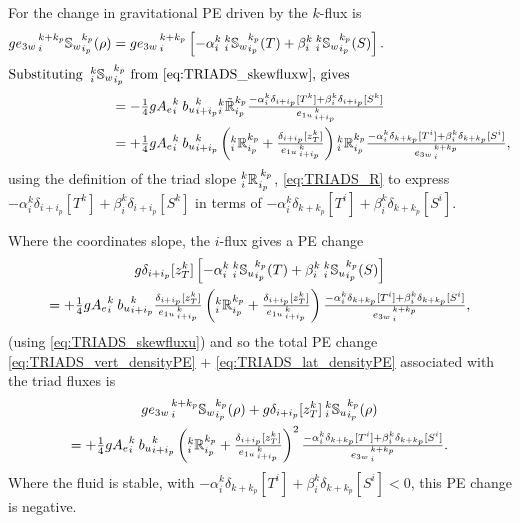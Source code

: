 \documentclass[../main/NEMO_manual]{subfiles}
\newcommand{\triadt}[5]{\ensuremath{{}_{#1}^{#2}{\tilde{\mathbb{#3}}}_{#4}^{\,#5}}}
\newcommand{\rtriad}[2][]{\ensuremath{\triad[#1]{i}{k}{#2}{i_p}{k_p}}}
\newcommand{\rtriadt}[1]{\ensuremath{\triadt{i}{k}{#1}{i_p}{k_p}}}
\begin{document}
For the change in gravitational PE driven by the $k$-flux is
\begin{align}
  \label{eq:TRIADS_vert_densityPE}
  g {e_{3w}}_{\,i}^{\,k+k_p}{\mathbb{S}_w}_{i_p}^{k_p} (\rho)
  &=g {e_{3w}}_{\,i}^{\,k+k_p}\left[-\alpha _i^k {\:}_i^k
    {\mathbb{S}_w}_{i_p}^{k_p} (T) + \beta_i^k {\:}_i^k
    {\mathbb{S}_w}_{i_p}^{k_p} (S) \right]. \notag \\
  \intertext{Substituting  ${\:}_i^k {\mathbb{S}_w}_{i_p}^{k_p}$ from \autoref{eq:TRIADS_skewfluxw}, gives}
  &=-\fractext{1}{4} g{A_e}_i^k{\: }{b_u}_{i+i_p}^k {_i^k\tilde{\mathbb{R}}_{i_p}^{k_p}}
    \frac{ -\alpha _i^k\delta_{i+ i_p}[T^k]+ \beta_i^k\delta_{i+ i_p}[S^k]} { {e_{1u}}_{\,i + i_p}^{\,k} } \notag \\
  &=+\fractext{1}{4} g{A_e}_i^k{\: }{b_u}_{i+i_p}^k
    \left({_i^k\mathbb{R}_{i_p}^{k_p}}+\frac{\delta_{i+i_p}[z_T^k]}{{e_{1u}}_{\,i + i_p}^{\,k}}\right) {_i^k\mathbb{R}_{i_p}^{k_p}}
    \frac{-\alpha_i^k \delta_{k+ k_p}[T^i]+ \beta_i^k\delta_{k+ k_p}[S^i]} {{e_{3w}}_{\,i}^{\,k+k_p}},
\end{align}
using the definition of the triad slope $\rtriad{R}$, \autoref{eq:TRIADS_R} to
express $-\alpha _i^k\delta_{i+ i_p}[T^k]+\beta_i^k\delta_{i+ i_p}[S^k]$ in terms of
$-\alpha_i^k \delta_{k+ k_p}[T^i]+ \beta_i^k\delta_{k+ k_p}[S^i]$.

Where the coordinates slope, the $i$-flux gives a PE change
\begin{multline}
  \label{eq:TRIADS_lat_densityPE}
  g \delta_{i+i_p}[z_T^k]
  \left[
    -\alpha _i^k {\:}_i^k {\mathbb{S}_u}_{i_p}^{k_p} (T) + \beta_i^k {\:}_i^k {\mathbb{S}_u}_{i_p}^{k_p} (S)
  \right] \\
  = +\textstyle \frac{1}{4} g{A_e}_i^k{\: }{b_u}_{i+i_p}^k
  \frac{\delta_{i+i_p}[z_T^k]}{{e_{1u}}_{\,i + i_p}^{\,k}}
  \left({_i^k\mathbb{R}_{i_p}^{k_p}}+\frac{\delta_{i+i_p}[z_T^k]}{{e_{1u}}_{\,i + i_p}^{\,k}}\right)
  \frac{-\alpha_i^k \delta_{k+ k_p}[T^i]+ \beta_i^k\delta_{k+ k_p}[S^i]} {{e_{3w}}_{\,i}^{\,k+k_p}},
\end{multline}
(using \autoref{eq:TRIADS_skewfluxu}) and so the total PE change \autoref{eq:TRIADS_vert_densityPE} +
\autoref{eq:TRIADS_lat_densityPE} associated with the triad fluxes is
\begin{multline*}
  g{e_{3w}}_{\,i}^{\,k+k_p}{\mathbb{S}_w}_{i_p}^{k_p} (\rho) +
  g\delta_{i+i_p}[z_T^k] {\:}_i^k {\mathbb{S}_u}_{i_p}^{k_p} (\rho) \\
  = +\textstyle \frac{1}{4} g{A_e}_i^k{\: }{b_u}_{i+i_p}^k
  \left({_i^k\mathbb{R}_{i_p}^{k_p}}+\frac{\delta_{i+i_p}[z_T^k]}{{e_{1u}}_{\,i + i_p}^{\,k}}\right)^2
  \frac{-\alpha_i^k \delta_{k+ k_p}[T^i]+ \beta_i^k\delta_{k+ k_p}[S^i]} {{e_{3w}}_{\,i}^{\,k+k_p}}.
\end{multline*}
Where the fluid is stable, with $-\alpha_i^k \delta_{k+ k_p}[T^i]+
\beta_i^k\delta_{k+ k_p}[S^i]<0$, this PE change is negative.
\end{document}

